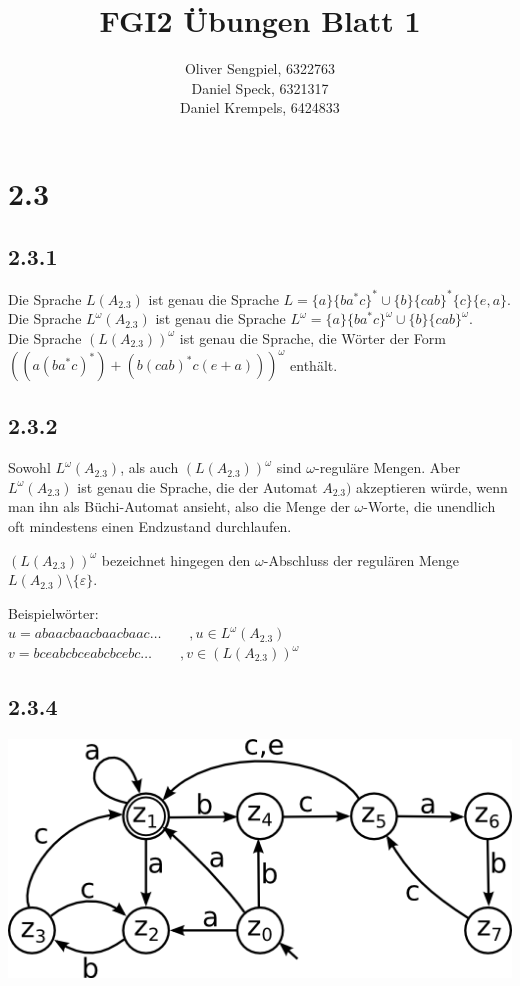 \documentclass{article}
\title{FGI2 Übungen Blatt 1}
\author{Oliver Sengpiel, 6322763 \\ Daniel Speck, 6321317 \\ Daniel
Krempels, 6424833}
\begin{document}
\maketitle

\section*{2.3}
\subsection*{2.3.1}
Die Sprache $L(A_{2.3})$ ist genau die Sprache $L = \{ a\} \{ba^*c\}^* \cup
\{ b\} \{cab\}^* \{c\} \{e , a\}$. \\
Die Sprache $L^\omega(A_{2.3})$ ist genau die Sprache $L^\omega = \{a \} 
\{ba^*c\}^\omega \cup \{ b \}\{cab\}^\omega $. \\
Die Sprache $(L(A_{2.3}))^\omega$ ist genau die Sprache, die Wörter der Form
$((a (ba^*c)^*) + (b (cab)^* c (e + a)))^\omega$ enthält.

\subsection*{2.3.2}
Sowohl $L^\omega (A_{2.3})$, als auch $(L(A_{2.3}))^\omega$ sind
$\omega$-reguläre Mengen. Aber $L^\omega (A_{2.3})$ ist genau die Sprache, die
der Automat $A_{2.3})$ akzeptieren würde, wenn man ihn als Büchi-Automat
ansieht, also die Menge der $\omega$-Worte, die unendlich oft mindestens einen
Endzustand durchlaufen.

$(L(A_{2.3}))^\omega$ bezeichnet hingegen den $\omega$-Abschluss der regulären
Menge $L(A_{2.3}) \setminus \{\varepsilon\}$.

Beispielwörter:\\
$u = abaacbaacbaacbaac \dots \qquad , u \in L^\omega (A_{2.3})$\\
$v = bceabcbceabcbcebc \dots \qquad ,v \in (L(A_{2.3}))^\omega$

\subsection*{2.3.4}
\includegraphics[width=\textwidth]{Automat1.png}
\end{document}
